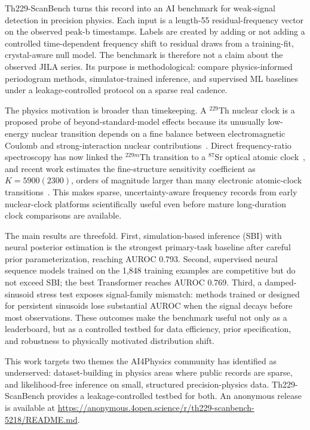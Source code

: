 \documentclass{article}
\newcommand{\thscan}{Th229-ScanBench}
\newcommand{\anonrepo}{\url{https://anonymous.4open.science/r/th229-scanbench-5218/README.md}}
\begin{document}
\thscan{} turns this record into an AI benchmark for weak-signal detection in precision physics.  Each input is a length-55 residual-frequency vector on the observed peak-b timestamps.  Labels are created by adding or not adding a controlled time-dependent frequency shift to residual draws from a training-fit, crystal-aware null model.  The benchmark is therefore not a claim about the observed JILA series.  Its purpose is methodological: compare physics-informed periodogram methods, simulator-trained inference, and supervised ML baselines under a leakage-controlled protocol on a sparse real cadence.

The physics motivation is broader than timekeeping.  A \(^{229}\)Th nuclear clock is a proposed probe of beyond-standard-model effects because its unusually low-energy nuclear transition depends on a fine balance between electromagnetic Coulomb and strong-interaction nuclear contributions~\citep{beeks2021thorium}.  Direct frequency-ratio spectroscopy has now linked the \(^{229m}\)Th transition to a \(^{87}\)Sr optical atomic clock~\citep{zhang2024frequency}, and recent work estimates the fine-structure sensitivity coefficient as \(K=5900(2300)\), orders of magnitude larger than many electronic atomic-clock transitions~\citep{beeks2025fine}.  This makes sparse, uncertainty-aware frequency records from early nuclear-clock platforms scientifically useful even before mature long-duration clock comparisons are available.

The main results are threefold.  First, simulation-based inference (SBI) with neural posterior estimation is the strongest primary-task baseline after careful prior parameterization, reaching AUROC 0.793.  Second, supervised neural sequence models trained on the 1,848 training examples are competitive but do not exceed SBI; the best Transformer reaches AUROC 0.769.  Third, a damped-sinusoid stress test exposes signal-family mismatch: methods trained or designed for persistent sinusoids lose substantial AUROC when the signal decays before most observations.  These outcomes make the benchmark useful not only as a leaderboard, but as a controlled testbed for data efficiency, prior specification, and robustness to physically motivated distribution shift.

This work targets two themes the AI4Physics community has identified as underserved: dataset-building in physics areas where public records are sparse, and likelihood-free inference on small, structured precision-physics data.  \thscan{} provides a leakage-controlled testbed for both.  An anonymous release is available at \anonrepo{}.
\end{document}
